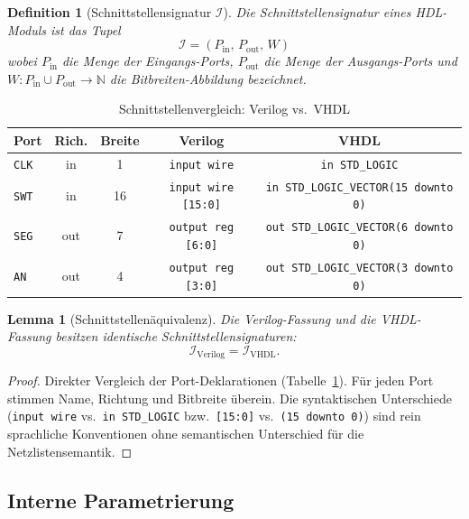 ﻿\documentclass[12pt,a4paper]{report}
\newtheorem{definition}{Definition}[section]
\newtheorem{lemma}[theorem]{Lemma}
\begin{document}
\begin{definition}[Schnittstellensignatur $\mathcal{I}$]
	\label{def:schnittstellensignatur}
	Die Schnittstellensignatur eines HDL-Moduls ist das Tupel
	\[
	\mathcal{I} = (P_\mathrm{in},\, P_\mathrm{out},\, W)
	\]
	wobei $P_\mathrm{in}$ die Menge der Eingangs-Ports, $P_\mathrm{out}$ die Menge
	der Ausgangs-Ports und $W : P_\mathrm{in} \cup P_\mathrm{out} \to \mathbb{N}$
	die Bitbreiten-Abbildung bezeichnet.
\end{definition}

\begin{table}
	\centering
	\begin{tabular}{|l|c|c|c|c|}
		\hline
		\textbf{Port} & \textbf{Rich.} & \textbf{Breite} & \textbf{Verilog} & \textbf{VHDL} \\
		\hline
		\texttt{CLK}  & in  & 1  & \texttt{input wire}               & \texttt{in STD\_LOGIC} \\
		\texttt{SWT}  & in  & 16 & \texttt{input wire [15:0]}        & \texttt{in STD\_LOGIC\_VECTOR(15 downto 0)} \\
		\texttt{SEG}  & out & 7  & \texttt{output reg [6:0]}         & \texttt{out STD\_LOGIC\_VECTOR(6 downto 0)} \\
		\texttt{AN}   & out & 4  & \texttt{output reg [3:0]}         & \texttt{out STD\_LOGIC\_VECTOR(3 downto 0)} \\
		\hline
	\end{tabular}
	\caption{Schnittstellenvergleich: Verilog vs.\ VHDL}
	\label{tab:schnittstelle}
\end{table}

\begin{lemma}[Schnittstellenäquivalenz]
	\label{lem:schnittstellen_equiv}
	Die Verilog-Fassung und die VHDL-Fassung besitzen identische Schnittstellensignaturen:
	\[
	\mathcal{I}_\mathrm{Verilog} = \mathcal{I}_\mathrm{VHDL}.
	\]
\end{lemma}

\begin{proof}
	Direkter Vergleich der Port-Deklarationen (Tabelle~\ref{tab:schnittstelle}).
	Für jeden Port stimmen Name, Richtung und Bitbreite überein.  Die syntaktischen
	Unterschiede (\texttt{input wire} vs.\ \texttt{in STD\_LOGIC} bzw.\
	\texttt{[15:0]} vs.\ \texttt{(15 downto 0)}) sind rein sprachliche Konventionen
	ohne semantischen Unterschied für die Netzlistensemantik.
\end{proof}

\subsection{Interne Parametrierung}
\end{document}
